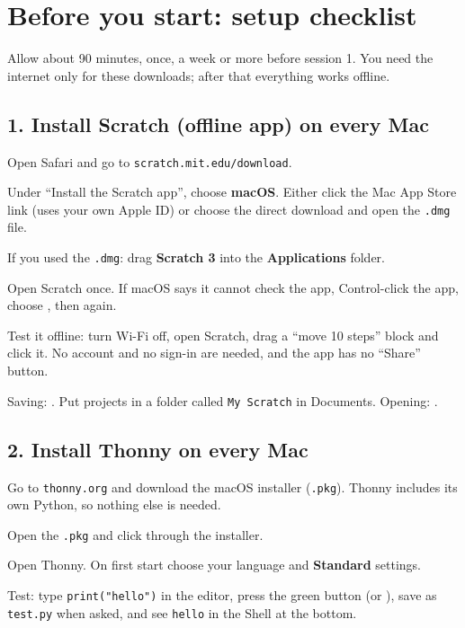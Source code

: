 \documentclass[level=1,teacher]{kidscode}
\begin{document}
\section{Before you start: setup checklist}
Allow about 90 minutes, once, a week or more before session 1. You need the internet only for these
downloads; after that everything works offline.

\subsection{1. Install Scratch (offline app) on every Mac}
\begin{checklist}
  \item Open Safari and go to \texttt{scratch.mit.edu/\allowbreak{}download}.
  \item Under \enquote{Install the Scratch app}, choose \textbf{macOS}. Either click the Mac App Store
        link (uses your own Apple ID) or choose the direct download and open the \texttt{.dmg} file.
  \item If you used the \texttt{.dmg}: drag \textbf{Scratch 3} into the \textbf{Applications} folder.
  \item Open Scratch once. If macOS says it cannot check the app, Control-click the app, choose
        , then  again.
  \item Test it offline: turn Wi-Fi off, open Scratch, drag a \enquote{move 10 steps} block and click it.
        No account and no sign-in are needed, and the app has no \enquote{Share} button.
  \item Saving: . Put projects in a folder called
        \texttt{My Scratch} in Documents. Opening: .
\end{checklist}

\subsection{2. Install Thonny on every Mac}
\begin{checklist}
  \item Go to \texttt{thonny.org} and download the macOS installer (\texttt{.pkg}). Thonny includes its
        own Python, so nothing else is needed.
  \item Open the \texttt{.pkg} and click through the installer.
  \item Open Thonny. On first start choose your language and \textbf{Standard} settings.
  \item Test: type \texttt{print("hello")} in the editor, press the green  button (or ),
        save as \texttt{test.py} when asked, and see \texttt{hello} in the Shell at the bottom.
\end{checklist}
\end{document}
